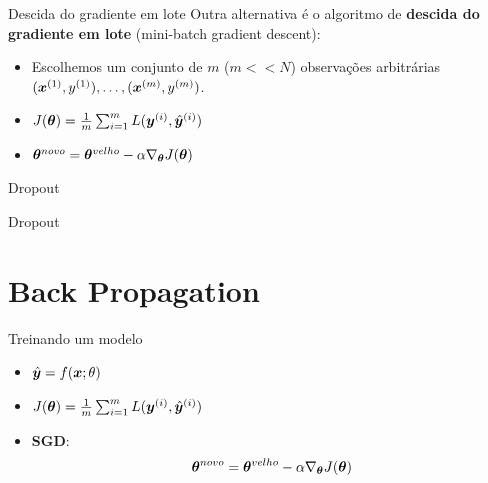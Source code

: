 \documentclass[10pt]{beamer}
\begin{document}
\begin{frame}[fragile]{Descida do gradiente em lote}
Outra alternativa é o algoritmo de \textbf{descida do gradiente em lote} (\alert{mini-batch gradient descent}):

\begin{itemize}
\item Escolhemos um conjunto de $m$ ($m << N$) observações arbitrárias $(\bm{x}^{(1)},y^{(1)}), \dots, (\bm{x}^{(m)},y^{(m)})$.
\vspace{0.3cm}
\item $J(\bm{\theta}) =  \frac{1}{m}\sum_{i=1}^{m} L(\bm{y}^{(i)}, {\hat{\bm{y}}}^{(i)})$
\vspace{0.3cm}
\item $\bm{\theta}^{novo} = \bm{\theta}^{velho} - \alpha \nabla_{\bm{\theta}} {J(\bm{\theta})}$
\end{itemize}
\end{frame}

\begin{frame}[fragile]{Dropout}

\end{frame}

\begin{frame}[fragile]{Dropout}

\end{frame}

\section{Back Propagation}

\begin{frame}{Treinando um modelo}
\Large{
\begin{itemize}
\item $\hat{\bm{y}} = f(\bm{x}; \theta)$ 
\item $J(\bm{\theta}) =  \frac{1}{m}\sum_{i=1}^{m} L(\bm{y}^{(i)}, {\hat{\bm{y}}}^{(i)})$ 
\item \textbf{SGD}:
\begin{equation*}
\bm{\theta}^{novo} = \bm{\theta}^{velho} - \alpha \nabla_{\bm{\theta}} {J(\bm{\theta})}
\end{equation*}
\vspace{0.3cm}
\end{itemize}
}

\end{frame}
\end{document}
